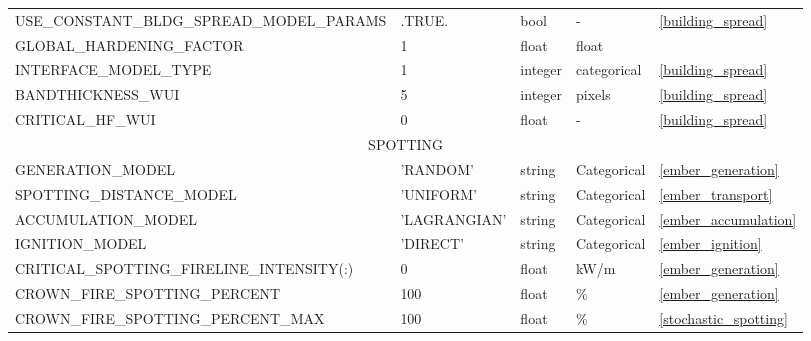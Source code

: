 \begin{landscape}
\begin{center}
\begin{longtable}{lllll}
USE\_CONSTANT\_BLDG\_SPREAD\_MODEL\_PARAMS   & .TRUE.                     & bool                   & -                                  & \ref{building_spread}                \\
GLOBAL\_HARDENING\_FACTOR                    & 1                          & float                  & float                              &                  \\
INTERFACE\_MODEL\_TYPE                       & 1                          & integer                & categorical                        & \ref{building_spread}                \\  
BANDTHICKNESS\_WUI                           & 5                          & integer                & pixels                             &  \ref{building_spread}\\
CRITICAL\_HF\_WUI                            & 0                          & float                  & -                                  &  \ref{building_spread}\\
\multicolumn{5}{c}{SPOTTING}                                                                                                                                                   \\
\toprule
GENERATION\_MODEL                            & 'RANDOM'                   & string                 & Categorical                        & \ref{ember_generation}               \\
SPOTTING\_DISTANCE\_MODEL                    & 'UNIFORM'                  & string                 & Categorical                        & \ref{ember_transport}                \\
ACCUMULATION\_MODEL                          & 'LAGRANGIAN'               & string                 & Categorical                        & \ref{ember_accumulation}             \\
IGNITION\_MODEL                              & 'DIRECT'                   & string                 & Categorical                        & \ref{ember_ignition}                 \\
CRITICAL\_SPOTTING\_FIRELINE\_INTENSITY(:)   & 0                          & float                  & kW/m                               & \ref{ember_generation}               \\
CROWN\_FIRE\_SPOTTING\_PERCENT               & 100                        & float                  & \%                                 & \ref{ember_generation}               \\
CROWN\_FIRE\_SPOTTING\_PERCENT\_MAX          & 100                        & float                  & \%                                 & \ref{stochastic_spotting}            \\

\end{longtable}
\end{center}
\end{landscape}
